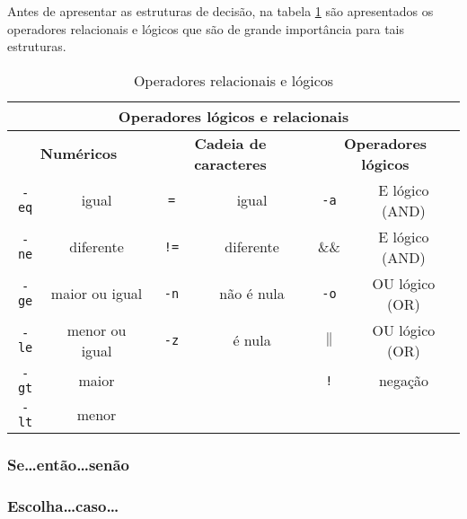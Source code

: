 \documentclass[11pt]{article}
\begin{document}
Antes de apresentar as estruturas de decisão, na tabela \ref{tabelaoperadores} são apresentados os operadores relacionais e lógicos que são de grande importância para tais estruturas.

\begin{table}[!htpb]
 \begin{center}
\begin{tabular}{|c|c||c|c||c|c|} \hline
\multicolumn{6}{|c|}{\textbf{Operadores lógicos e relacionais}} \\ \hline
\multicolumn{2}{|c||}{\textbf{Numéricos}} & \multicolumn{2}{|c||}{\textbf{Cadeia de caracteres}} & \multicolumn{2}{|c|}{\textbf{Operadores lógicos}}\\ \hline \hline
\texttt{-eq} & igual     & \texttt{=} & igual & \texttt{-a} & E lógico (AND) \\ \hline
\texttt{-ne} & diferente & \texttt{!=} & diferente & \&\& & E lógico (AND)\\ \hline
\texttt{-ge} & maior ou igual & \texttt{-n} & não é nula & \texttt{-o} & OU lógico (OR)\\ \hline
\texttt{-le} & menor ou igual & \texttt{-z} & é nula & $\|$ & OU lógico (OR)\\ \hline
\texttt{-gt} & maior &  & & \texttt{!} & negação \\ \hline
\texttt{-lt} & menor &  &  & &\\ \hline
 \end{tabular}
 \end{center}
\caption{Operadores relacionais e lógicos}
\label{tabelaoperadores}
\end{table}


\subsubsection{Se\ldots então\ldots senão}


\clearpage


\subsubsection{Escolha\ldots caso\ldots}


\newpage
\end{document}
